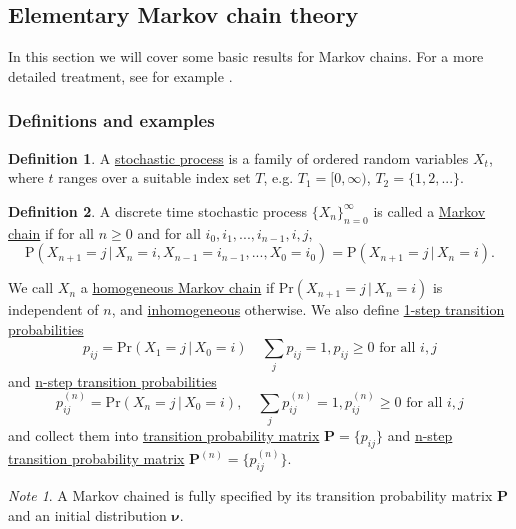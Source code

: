 \documentclass[11pt]{article}\usepackage[]{graphicx}\usepackage[]{color}
\numberwithin{algorithm}{section}
\newcommand{\cprob}[2]{\ensuremath{\text{Pr}\left(#1 \,|\,#2\right)}}
\theoremstyle{remark}
\newtheorem*{mynote}{Note}
\theoremstyle{definition}
\newtheorem*{define}{Definition}
\begin{document}
\subsection{Elementary Markov chain theory}
In this section we will cover some basic results for Markov chains. For a more detailed treatment, see for example
\citep{BremaudBook}.

\subsubsection{Definitions and examples}

\begin{define}
A \underline{stochastic process} is a family of ordered random variables $X_t$, where $t$
ranges over a suitable index set $T$, e.g. $T_1 = [0, \infty)$, $T_2 =
\{1,2,...\}$.
\end{define}

\begin{define}
  A discrete time stochastic process $\{X_n\}_{n=0}^\infty$ is
  called a \underline{Markov chain} if for all $n \ge 0$ and for all 
  $i_0, i_1, ..., i_{n-1}, i, j$,
  \begin{equation*}
    \text{P}(X_{n+1} = j\,|\, X_n = i, X_{n-1} = i_{n-1}, ..., X_0 = i_0) = 
    \text{P}(X_{n + 1} = j \,|\, X_n = i).
  \end{equation*}

\noindent
We call $X_n$ a \underline{homogeneous Markov chain} if $\cprob{X_{n+1} = j}{X_n = i}$ 
is independent of $n$, and \underline{inhomogeneous} otherwise.
We also define \underline{1-step transition probabilities}
\begin{equation*}
  p_{ij} = \cprob{X_1 = j }{X_0 = i} \quad \sum_j p_{ij} = 1, p_{ij} \ge 0 \text{ for all } i,j
\end{equation*}
and \underline{n-step transition probabilities}
\begin{equation*}
  p_{ij}^{(n)} = \cprob{X_{n} = j}{X_0 = i}, \quad \sum_j p_{ij}^{(n)} = 1, 
  p_{ij}^{(n)} \ge 0 \text{ for all } i,j
\end{equation*}
and collect them into \underline{transition probability matrix} $\mathbf{P} = \{p_{ij}\}$
and \underline{n-step transition probability matrix} $\mathbf{P}^{(n)} = \{p_{ij}^{(n)}\}$.
\end{define}

\begin{mynote}
  A Markov chained is fully specified by its transition probability matrix $\mathbf{P}$ 
  and an initial distribution $\boldsymbol{\nu}$.
\end{mynote}
\end{document}
